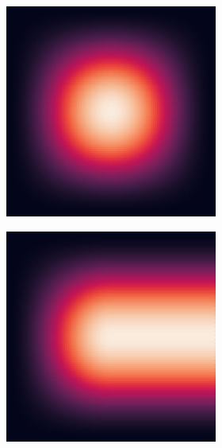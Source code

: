 \begin{figure}
\begin{subfigure}{0.5\textwidth}
\begin{subfigure}{.32\textwidth}
    \end{subfigure}
    \begin{subfigure}{.32\textwidth}
      \centering
      \includegraphics[width=\textwidth]{Images/hann_window_11.jpg}
    \end{subfigure}
    \begin{subfigure}{.32\textwidth}
      \centering
      \includegraphics[width=\textwidth]{Images/hann_window_21.jpg}

\end{subfigure}
\end{subfigure}
\end{figure}
